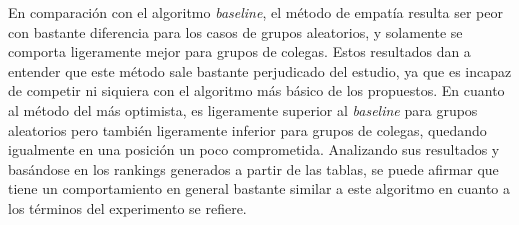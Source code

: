 En comparación con el algoritmo \textit{baseline}, el método de empatía resulta ser peor con bastante diferencia para los casos de grupos aleatorios, y solamente se comporta ligeramente mejor para grupos de colegas. Estos resultados dan a entender que este método sale bastante perjudicado del estudio, ya que es incapaz de competir ni siquiera con el algoritmo más básico de los propuestos. En cuanto al método del más optimista, es ligeramente superior al \textit{baseline} para grupos aleatorios pero también ligeramente inferior para grupos de colegas, quedando igualmente en una posición un poco comprometida. Analizando sus resultados y basándose en los rankings generados a partir de las tablas, se puede afirmar que tiene un comportamiento en general bastante similar a este algoritmo en cuanto a los términos del experimento se refiere.